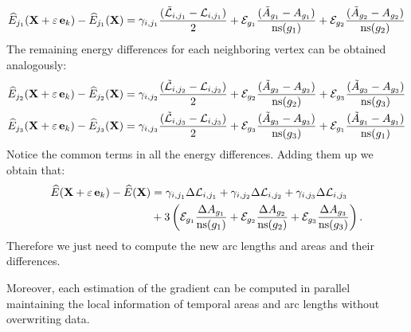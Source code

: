\begin{equation}
    \widehat{E}_{j_1}(\X+\varepsilon\,  \ei{k}) - \widehat{E}_{j_1}(\X) = \gamma_{i,j_1}\frac{(\Tilde{\AL}_{i, j_1} - \AL_{i, j_1})}{2} + \SE_{g_1}\frac{(\Tilde{A}_{g_1} - A_{g_1})}{\ns(g_1)} + \SE_{g_2}\frac{(\Tilde{A}_{g_2} - A_{g_2})}{\ns(g_2)}
\end{equation}
The remaining energy differences for each neighboring vertex can be obtained analogously:
\begin{align}
    \widehat{E}_{j_2}(\X+\varepsilon\,  \ei{k}) - \widehat{E}_{j_2}(\X) &= \gamma_{i,j_2}\frac{(\Tilde{\AL}_{i, j_2} - \AL_{i, j_2})}{2} + \SE_{g_2}\frac{(\Tilde{A}_{g_2} - A_{g_2})}{\ns(g_2)} + \SE_{g_3}\frac{(\Tilde{A}_{g_3} - A_{g_3})}{\ns(g_3)}\\
    \widehat{E}_{j_3}(\X+\varepsilon\,  \ei{k}) - \widehat{E}_{j_3}(\X) &= \gamma_{i,j_3}\frac{(\Tilde{\AL}_{i, j_3} - \AL_{i, j_3})}{2} + \SE_{g_3}\frac{(\Tilde{A}_{g_3} - A_{g_3})}{\ns(g_3)} + \SE_{g_1}\frac{(\Tilde{A}_{g_1} - A_{g_1})}{\ns(g_1)}
\end{align}
Notice the common terms in all the energy differences. Adding them up we obtain that:
\begin{align}
 \widehat{E}(\X+\varepsilon\,  \ei{k}) - \widehat{E}(\X) &= \gamma_{i,j_1} \Delta \AL_{i, j_1} + \gamma_{i,j_2} \Delta \AL_{i, j_2} + \gamma_{i,j_3} \Delta \AL_{i, j_3} \nonumber\\
 &+ 3\left( \SE_{g_1}\frac{\Delta A_{g_1}}{\ns(g_1)} + \SE_{g_2}\frac{\Delta A_{g_2}}{\ns(g_2)} + \SE_{g_3}\frac{\Delta A_{g_3}}{\ns(g_3)}\right).
 \label{eq:diffenergy}
\end{align}
Therefore we just need to compute the new arc lengths and areas and their differences.

Moreover, each estimation of the gradient can be computed in parallel maintaining the local information of temporal areas and arc lengths without overwriting data.